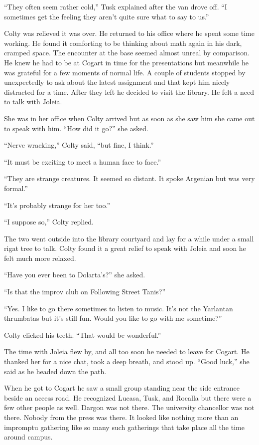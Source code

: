 ``They often seem rather cold,'' Tusk explained after the van drove off. ``I sometimes get the
feeling they aren't quite sure what to say to us.''

Colty was relieved it was over. He returned to his office where he spent some time working. He
found it comforting to be thinking about math again in his dark, cramped space. The encounter at
the base seemed almost unreal by comparison. He knew he had to be at Cogart in time for the
presentations but meanwhile he was grateful for a few moments of normal life. A couple of
students stopped by unexpectedly to ask about the latest assignment and that kept him nicely
distracted for a time. After they left he decided to visit the library. He felt a need to talk
with Joleia.

She was in her office when Colty arrived but as soon as she saw him she came out to speak with
him. ``How did it go?'' she asked.

``Nerve wracking,'' Colty said, ``but fine, I think.''

``It must be exciting to meet a human face to face.''

``They are strange creatures. It seemed so distant. It spoke Argenian but was very formal.''

``It's probably strange for her too.''

``I suppose so,'' Colty replied.

The two went outside into the library courtyard and lay for a while under a small rigat tree to
talk. Colty found it a great relief to speak with Joleia and soon he felt much more relaxed.

``Have you ever been to Dolarta's?'' she asked.

``Is that the improv club on Following Street Tanis?''

``Yes. I like to go there sometimes to listen to music. It's not the Yarlantan thrumbatas but
it's still fun. Would you like to go with me sometime?''

Colty clicked his teeth. ``That would be wonderful.''

The time with Joleia flew by, and all too soon he needed to leave for Cogart. He thanked her for
a nice chat, took a deep breath, and stood up. ``Good luck,'' she said as he headed down the
path.

When he got to Cogart he saw a small group standing near the side entrance beside an access
road. He recognized Lucasa, Tusk, and Rocalla but there were a few other people as well. Dargon
was not there. The university chancellor was not there. Nobody from the press was there. It
looked like nothing more than an impromptu gathering like so many such gatherings that take
place all the time around campus.

